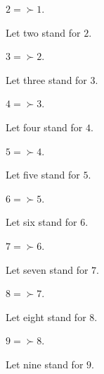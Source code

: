\documentclass[../arithmetic.tex]{subfiles}
\begin{document}
  \begin{forthel}
    \begin{definition}
      $2 = \succ{1}$.
    \end{definition}

    Let two stand for $2$.
  \end{forthel}

  \begin{forthel}
    \begin{definition}
      $3 = \succ{2}$.
    \end{definition}

    Let three stand for $3$.
  \end{forthel}

  \begin{forthel}
    \begin{definition}
      $4 = \succ{3}$.
    \end{definition}

    Let four stand for $4$.
  \end{forthel}

  \begin{forthel}
    \begin{definition}
      $5 = \succ{4}$.
    \end{definition}

    Let five stand for $5$.
  \end{forthel}

  \begin{forthel}
    \begin{definition}
      $6 = \succ{5}$.
    \end{definition}

    Let six stand for $6$.
  \end{forthel}

  \begin{forthel}
    \begin{definition}
      $7 = \succ{6}$.
    \end{definition}

    Let seven stand for $7$.
  \end{forthel}

  \begin{forthel}
    \begin{definition}
      $8 = \succ{7}$.
    \end{definition}

    Let eight stand for $8$.
  \end{forthel}

  \begin{forthel}
    \begin{definition}
      $9 = \succ{8}$.
    \end{definition}

    Let nine stand for $9$.
  \end{forthel}
\end{document}
